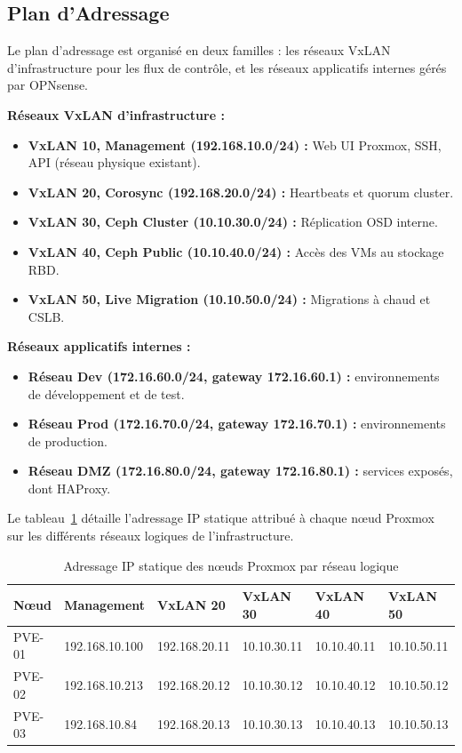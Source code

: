 \subsection{Plan d'Adressage}

\par Le plan d'adressage est organisé en deux familles : les réseaux VxLAN d'infrastructure pour les flux de contrôle, et les réseaux applicatifs internes gérés par OPNsense.\\

\par \textbf{Réseaux VxLAN d'infrastructure :}
\begin{itemize}
    \item \textbf{VxLAN 10, Management (192.168.10.0/24) :} Web UI Proxmox, SSH, API (réseau physique existant).
    \item \textbf{VxLAN 20, Corosync (192.168.20.0/24) :} Heartbeats et quorum cluster.
    \item \textbf{VxLAN 30, Ceph Cluster (10.10.30.0/24) :} Réplication OSD interne.
    \item \textbf{VxLAN 40, Ceph Public (10.10.40.0/24) :} Accès des VMs au stockage RBD.
    \item \textbf{VxLAN 50, Live Migration (10.10.50.0/24) :} Migrations à chaud et CSLB.
\end{itemize}

\par \textbf{Réseaux applicatifs internes :}
\begin{itemize}
    \item \textbf{Réseau Dev (172.16.60.0/24, gateway 172.16.60.1) :} environnements de développement et de test.
    \item \textbf{Réseau Prod (172.16.70.0/24, gateway 172.16.70.1) :} environnements de production.
    \item \textbf{Réseau DMZ (172.16.80.0/24, gateway 172.16.80.1) :} services exposés, dont HAProxy.
\end{itemize}

\par Le tableau~\ref{tab:adressage-statique} détaille l'adressage IP statique attribué à chaque nœud Proxmox sur les différents réseaux logiques de l'infrastructure.\\

\begin{table}[H]
\centering
\caption{Adressage IP statique des nœuds Proxmox par réseau logique}
\label{tab:adressage-statique}
\begin{tabular}{|l|l|l|l|l|l|}
\hline
\textbf{Nœud} & \textbf{Management} & \textbf{VxLAN 20} & \textbf{VxLAN 30} & \textbf{VxLAN 40} & \textbf{VxLAN 50} \\
\hline
PVE-01 & 192.168.10.100 & 192.168.20.11 & 10.10.30.11 & 10.10.40.11 & 10.10.50.11 \\
\hline
PVE-02 & 192.168.10.213 & 192.168.20.12 & 10.10.30.12 & 10.10.40.12 & 10.10.50.12 \\
\hline
PVE-03 & 192.168.10.84  & 192.168.20.13 & 10.10.30.13 & 10.10.40.13 & 10.10.50.13 \\
\hline
\end{tabular}
\end{table}

